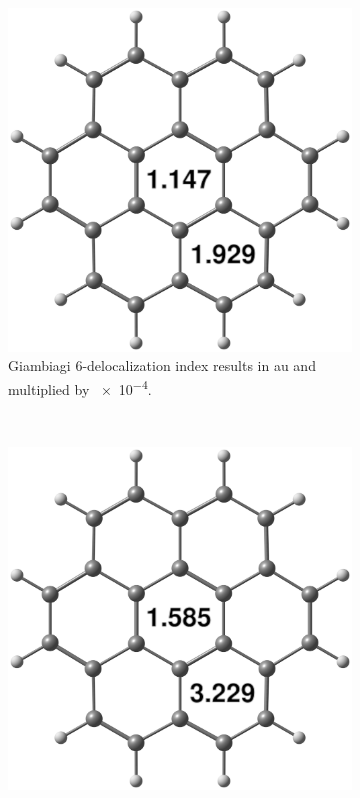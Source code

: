 \documentclass[a4paper,11pt,openany]{memoir}
\begin{document}
\begin{center}
	\begin{figure}
		\centering
		\begin{subfigure}[b]{0.4\textwidth}
			\includegraphics[width=\textwidth]{./figures/coronene-giamb}
			\caption{{\small Giambiagi 6-delocalization index results in au and multiplied by \num{e-4}.}}
			\label{fig:CoroneneGiamb}
		\end{subfigure}
		~ %
		\begin{subfigure}[b]{0.4\textwidth}
			\includegraphics[width=\textwidth]{./figures/coronene-ponec}

\end{subfigure}
\end{figure}
\end{center}
\end{document}
